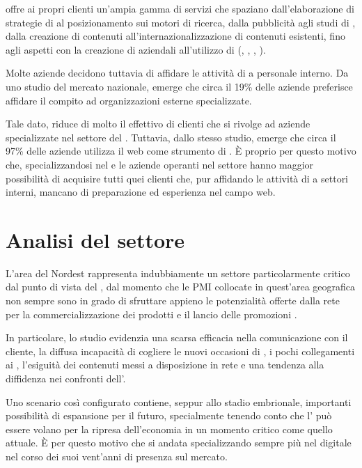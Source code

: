 \customer offre ai propri clienti un'ampia gamma di servizi che spaziano dall'elaborazione di strategie di \mktg al posizionamento sui motori di ricerca, dalla pubblicità  agli studi di , dalla creazione di contenuti all'internazionalizzazione di contenuti esistenti, fino agli aspetti  con la creazione di  aziendali all'utilizzo di  (, , , ).

Molte aziende decidono tuttavia di affidare le attività di \mktg a personale interno. Da uno studio del mercato nazionale, emerge che circa il 19\% delle aziende preferisce affidare il compito ad organizzazioni esterne specializzate.

Tale dato, riduce di molto il  effettivo di clienti che si rivolge ad aziende specializzate nel settore del \mktg.
Tuttavia, dallo stesso studio, emerge che circa il 97\% delle aziende utilizza il web come strumento di \mktg. È  proprio per questo motivo che, specializzandosi nel \mktg {} e  le aziende operanti nel settore hanno maggior possibilità di acquisire tutti quei clienti che, pur affidando le attività di \mktg a settori interni,  mancano di preparazione ed esperienza nel campo web.

\section{Analisi del settore}
L'area del Nordest rappresenta indubbiamente un settore particolarmente critico dal punto di vista del \mktg {}, dal momento che le PMI collocate in quest'area geografica non sempre sono in grado di sfruttare appieno le potenzialità offerte dalla rete per la commercializzazione dei prodotti e il lancio delle promozioni \cite[\itshape{}pag. 6 e succ.]{bassi:pmi}.

In particolare, lo studio evidenzia una scarsa efficacia nella comunicazione con il cliente, la diffusa incapacità di cogliere le nuovi occasioni di \bsn, i pochi collegamenti ai , l'esiguità dei contenuti messi a disposizione in rete e una tendenza alla diffidenza nei confronti dell'.

Uno scenario così configurato contiene, seppur allo stadio embrionale, importanti possibilità di espansione per il futuro, specialmente tenendo conto che l' può essere volano per la ripresa dell'economia in un momento critico come quello attuale. È per questo motivo che \customer si andata specializzando sempre più nel \mktg digitale nel corso dei suoi vent'anni di presenza sul mercato.

